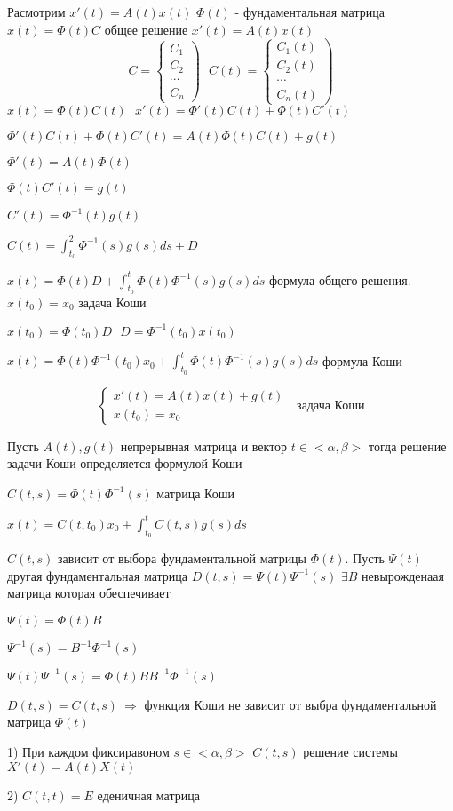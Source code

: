 Расмотрим $x'(t) = A(t)x(t)$ $\Phi(t)$ - фундаментальная матрица
$x(t) = \Phi(t) C$ общее решение $x'(t) = A(t)x(t)$
$$
C =
\left\{
\begin{array}{c}
  C_1 \\
  C_2 \\
  \cdots \\
  C_n
\end{array}
\right) ~~~
C(t) =
\left\{
\begin{array}{c}
  C_1(t) \\
  C_2(t) \\
  \cdots \\
  C_n(t)
\end{array}
\right)
$$
$x(t) = \Phi(t)C(t) ~~~ x'(t) = \Phi'(t)C(t) + \Phi(t)C'(t)$

$\Phi'(t)C(t) + \Phi(t)C'(t) = A(t)\Phi(t)C(t) + g(t)$

$\Phi'(t) = A(t) \Phi(t)$

$\Phi(t)C'(t) = g(t)$

$C'(t) = \Phi^{-1}(t)g(t)$

$C(t) = \int_{t_0}^2 \Phi^{-1}(s)g(s)ds + D$

$x(t) = \Phi(t)D + \int_{t_0}^t\Phi(t) \Phi^{-1}(s)g(s)ds$ формула общего
решения. $x(t_0) = x_0$ задача Коши

$x(t_0) = \Phi(t_0)D ~~~ D = \Phi^{-1}(t_0)x(t_0)$

$x(t) = \Phi(t) \Phi^{-1}(t_0)x_0 + \int_{t_0}^t \Phi(t)\Phi^{-1}(s)g(s)ds$
формула Коши

$$
\left\{
\begin{array}{c}
  x'(t) = A(t)x(t) + g(t) \\
  x(t_0) = x_0
\end{array}
\right. ~~~ \text{задача Коши}
$$

\begin{theorem}
  Пусть $A(t), g(t)$ непрерывная матрица и вектор $t \in <\alpha, \beta>$ тогда
  решение задачи Коши определяется формулой Коши
\end{theorem}

$C(t,s) = \Phi(t)\Phi^{-1}(s)$ матрица Коши

$x(t) = C(t, t_0)x_0 + \int_{t_0}^t C(t,s)g(s)ds$

$C(t,s)$ зависит от выбора фундаментальной матрицы $\Phi(t)$. Пусть $\Psi(t)$
другая фундаментальная матрица $D(t,s) = \Psi(t)\Psi^{-1}(s)$ $\exists B$
невырожденаая матрица которая обеспечивает

$\Psi(t) = \Phi(t)B$

$\Psi^{-1}(s) = B^{-1} \Phi^{-1}(s)$

$\Psi(t) \Psi^{-1}(s) = \Phi(t) B B^{-1} \Phi^{-1}(s)$

$D(t, s) = C(t, s) ~ \Rightarrow$ функция Коши не зависит от выбра
фундаментальной матрица $\Phi(t)$

\begin{block}[Свойства]
  1) При каждом фиксиравоном $s \in <\alpha, \beta>$ $C(t, s)$ решение системы
  $X'(t) = A(t)X(t)$

  2) $C(t,t) = E$ еденичная матрица
\end{block}